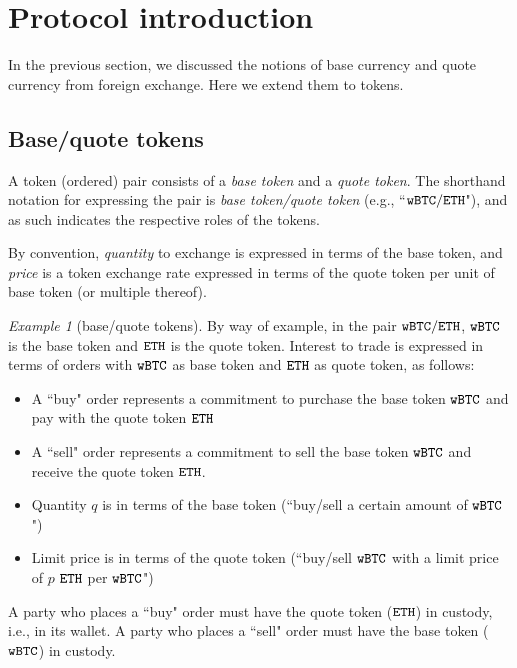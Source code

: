 \documentclass[11pt, reqno]{amsart}
\theoremstyle{definition}
\theoremstyle{remark}
\newtheorem{exmp}{Example}[subsection]
\newcommand{\BTC}{\textnormal{\texttt{wBTC}}}
\newcommand{\ETH}{\textnormal{\texttt{ETH}}}
\begin{document}

\section{Protocol introduction}
In the previous section, we discussed the notions of base currency and
quote currency from foreign exchange. Here we extend them to tokens.

\subsection{Base/quote tokens}
A token (ordered) pair consists of a \emph{base token} and a
\emph{quote token}. The shorthand notation for expressing the pair is
\emph{base token/quote token} (e.g., ``$\BTC/\ETH$"), and as such indicates the
respective roles of the tokens.

By convention, \emph{quantity} to exchange is expressed in terms of the base
token, and \emph{price} is a token exchange rate expressed in terms of the
quote token per unit of base token (or multiple thereof).

\begin{exmp}[base/quote tokens]
By way of example, in the pair $\BTC/\ETH$, $\BTC$ is the base token and $\ETH$
is the quote token. Interest to trade is expressed in terms of orders
with $\BTC$ as base token and $\ETH$ as quote token, as follows:
\begin{itemize}
    \item A ``buy" order represents a commitment to purchase the base token
          $\BTC$ and pay with the quote token $\ETH$
    \item A ``sell" order represents a commitment to sell the base token
          $\BTC$ and receive the quote token $\ETH$.
    \item Quantity $q$ is in terms of the base token (``buy/sell a certain
          amount of $\BTC$")
    \item Limit price is in terms of the quote token (``buy/sell $\BTC$ with a
          limit price of $p$ $\ETH$ per $\BTC$")
\end{itemize}
A party who places a ``buy" order must have the quote token ($\ETH$) in custody,
i.e., in its wallet. A party who places a ``sell" order must have the base
token ($\BTC$) in custody.
\end{exmp}
\end{document}
